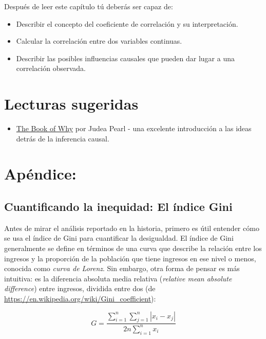 \documentclass[
  12pt,
]{book}
\providecommand{\tightlist}{%
  \setlength{\itemsep}{0pt}\setlength{\parskip}{0pt}}
\begin{document}
Después de leer este capítulo tú deberás ser capaz de:

\begin{itemize}
\tightlist
\item
  Describir el concepto del coeficiente de correlación y su interpretación.
\item
  Calcular la correlación entre dos variables continuas.
\item
  Describir las posibles influencias causales que pueden dar lugar a una correlación observada.
\end{itemize}

\hypertarget{lecturas-sugeridas}{%
\section{Lecturas sugeridas}\label{lecturas-sugeridas}}

\begin{itemize}
\tightlist
\item
  \href{http://bayes.cs.ucla.edu/WHY/}{The Book of Why} por Judea Pearl - una excelente introducción a las ideas detrás de la inferencia causal.
\end{itemize}

\hypertarget{apuxe9ndice}{%
\section{Apéndice:}\label{apuxe9ndice}}

\hypertarget{cuantificando-la-inequidad-el-uxedndice-gini}{%
\subsection{Cuantificando la inequidad: El índice Gini}\label{cuantificando-la-inequidad-el-uxedndice-gini}}

Antes de mirar el análisis reportado en la historia, primero es útil entender cómo se usa el índice de Gini para cuantificar la desigualdad. El índice de Gini generalmente se define en términos de una curva que describe la relación entre los ingresos y la proporción de la población que tiene ingresos en ese nivel o menos, conocida como \emph{curva de Lorenz}. Sin embargo, otra forma de pensar es más intuitiva: es la diferencia absoluta media relativa (\emph{relative mean absolute difference}) entre ingresos, dividida entre dos (de \url{https://en.wikipedia.org/wiki/Gini_coefficient}):

\[
G = \frac{\displaystyle{\sum_{i=1}^n \sum_{j=1}^n \left| x_i - x_j \right|}}{\displaystyle{2n\sum_{i=1}^n x_i}} 
\]
\end{document}
